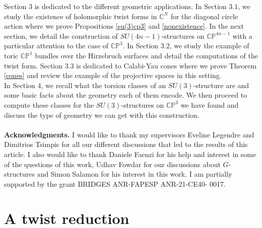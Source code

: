 \documentclass[12pt, reqno]{amsart}
\newcommand{\C}{\mathbb{C}}
\newcommand{\p}{\mathbb{P}}
\begin{document}
\indent Section $3$ is dedicated to the different geometric applications. In Section $3.1$, we study the existence of holomorphic twist forms in $\C^N$ for the diagonal circle action where we prove Propositions \ref{su(3)cp3} and \ref{nonexistence}. In the next section, we detail the construction of $SU(4n-1)$-structures on $\C\p^{4n-1}$ with a particular attention to the case of $\C\p^3$. In Section $3.2$, we study the example of toric $\C\p^1$ bundles over the Hirzebruch surfaces and detail the computations of the twist form. Section $3.3$ is dedicated to Calabi-Yau cones where we prove Theorem \ref{cones} and review the example of the projective spaces in this setting.\\
\indent In Section $4$, we recall what the torsion classes of an $SU(3)$-structure are and some basic facts about the geometry each of them encode. We then proceed to compute these classes for the $SU(3)$-structures on $\C\p^3$ we have found and discuss the type of geometry we can get with this construction. \\ \\
\textbf{Acknowledgments.} I would like to thank my supervisors Eveline Legendre and Dimitrios Tsimpis for all our different discussions that led to the results of this article. I also would like to thank Daniele Faenzi for his help and interest in some of the questions of this work, Udhav Fowdar for our discussions about $G$-structures and Simon Salamon for his interest in this work.  I am partially supported by the grant BRIDGES ANR-FAPESP ANR-21-CE40- 0017.
\section{A twist reduction}
\end{document}
